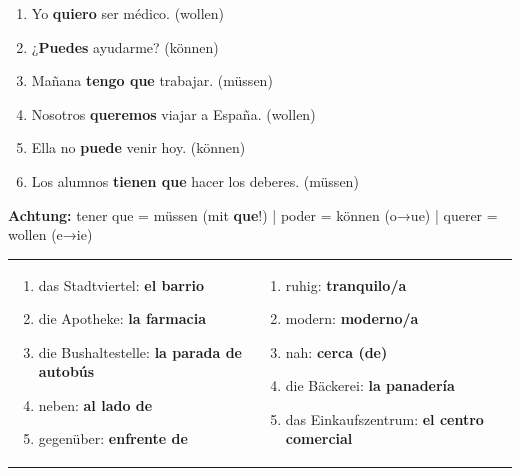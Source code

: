 \documentclass[11pt, a4paper]{article}
\newcommand{\lsg}[1]{\textcolor{loesung}{\textbf{#1}}}
\begin{document}
\begin{tcolorbox}[
    colback=hellgrau,
    colframe=spanisch,
    title={\color{white}\bfseries Aufgabe 3: Completa con poder, querer o tener que},
    fonttitle=\bfseries
]

\begin{enumerate}[label=\alph*)]
    \item Yo \lsg{quiero} ser médico. (wollen)
    \item ¿\lsg{Puedes} ayudarme? (können)
    \item Mañana \lsg{tengo que} trabajar. (müssen)
    \item Nosotros \lsg{queremos} viajar a España. (wollen)
    \item Ella no \lsg{puede} venir hoy. (können)
    \item Los alumnos \lsg{tienen que} hacer los deberes. (müssen)
\end{enumerate}

\vspace{0.2cm}
\footnotesize\textbf{Achtung:} tener que = müssen (mit \textbf{que}!) | poder = können (o→ue) | querer = wollen (e→ie)
\end{tcolorbox}

\vspace{0.3cm}


\begin{tcolorbox}[
    colback=hellgrau,
    colframe=spanisch,
    title={\color{white}\bfseries Aufgabe 4: Vocabulario -- Traduce al español},
    fonttitle=\bfseries
]

\begin{tabular}{@{}p{8cm}p{8cm}@{}}
\begin{enumerate}[label=\alph*)]
    \item das Stadtviertel: \lsg{el barrio}
    \item die Apotheke: \lsg{la farmacia}
    \item die Bushaltestelle: \lsg{la parada de autobús}
    \item neben: \lsg{al lado de}
    \item gegenüber: \lsg{enfrente de}
\end{enumerate}
&
\begin{enumerate}[label=\alph*), start=6]
    \item ruhig: \lsg{tranquilo/a}
    \item modern: \lsg{moderno/a}
    \item nah: \lsg{cerca (de)}
    \item die Bäckerei: \lsg{la panadería}
    \item das Einkaufszentrum: \lsg{el centro comercial}
\end{enumerate}
\end{tabular}
\end{tcolorbox}
\end{document}
